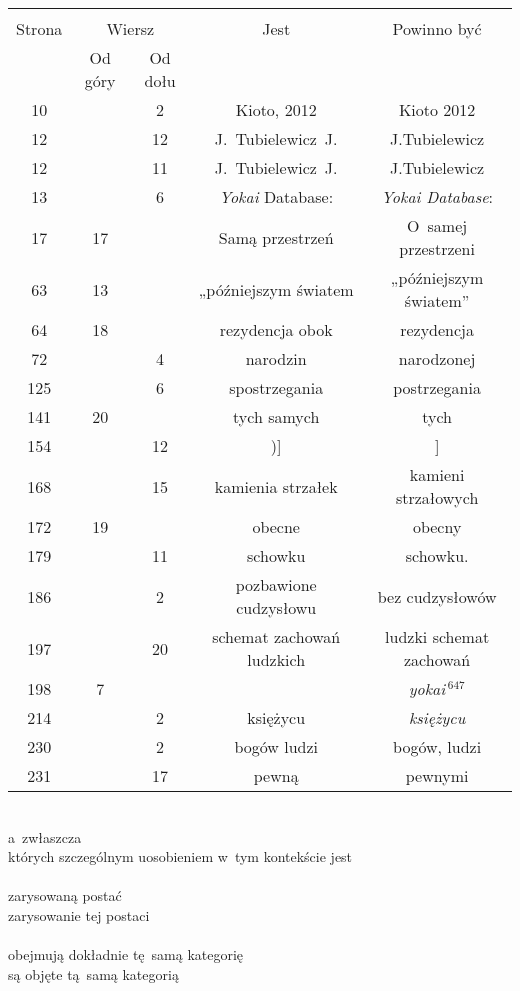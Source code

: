 \documentclass[a4paper,11pt]{article}
\begin{document}
\begin{center}

  \begin{tabular}{|c|c|c|c|c|}
    \hline
    & \multicolumn{2}{c|}{} & & \\
    Strona & \multicolumn{2}{c|}{Wiersz} & Jest
                              & Powinno być \\ \cline{2-3}
    & Od góry & Od dołu & & \\
    \hline
    10  & &  2 & Kioto, 2012 & Kioto 2012 \\
    12  & & 12 & J.~Tubielewicz~J. & J.Tubielewicz \\
    12  & & 11 & J.~Tubielewicz~J. & J.Tubielewicz \\
    13  & &  6 & \emph{Yokai} Database: & \emph{Yokai Database}: \\
    17  & 17 & & Samą przestrzeń & O~samej przestrzeni \\
    63  & 13 & & „późniejszym światem & „późniejszym światem” \\
    64  & 18 & & rezydencja obok & rezydencja \\
    72  & &  4 & narodzin & narodzonej \\
    125 & &  6 & spostrzegania & postrzegania \\
    141 & 20 & & tych samych & tych \\
    154 & & 12 & )] & ] \\
    168 & & 15 & kamienia strzałek & kamieni strzałowych \\
    172 & 19 & & obecne & obecny \\
    179 & & 11 & schowku & schowku. \\
    186 & &  2 & pozbawione cudzysłowu & bez cudzysłowów \\
    197 & & 20 & schemat zachowań ludzkich & ludzki schemat zachowań \\
    198 &  7 & & & \emph{yokai$\,^{647}$} \\  %
    214 & &  2 & księżycu & \emph{księżycu} \\
    230 & &  2 & bogów ludzi & bogów, ludzi \\
    231 & & 17 & pewną & pewnymi \\
    \hline
  \end{tabular}

\end{center}


\noindent
{} \\
\Jest  a~zwłaszcza \\
\Powin których szczególnym uosobieniem w~tym kontekście jest \\
 \\
\Jest  zarysowaną postać \\
\Powin zarysowanie tej postaci \\
 \\
\Jest  obejmują dokładnie tę~samą kategorię \\
\Powin są objęte tą~samą kategorią \\
\end{document}
